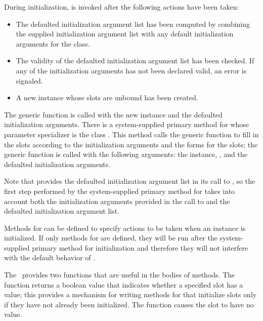 
During initialization,  is invoked
after the following actions have been taken:

\begin{itemize} 

\item  The defaulted initialization argument list has been computed by
combining the supplied initialization argument list with any default
initialization arguments for the class.

\item  The validity of the defaulted initialization argument
list has been checked.  If any of the initialization arguments has not
been declared valid, an error is signaled.

\item  A new instance whose slots are unbound has been created.

\end{itemize}

The generic function  is called with the
new instance and the defaulted initialization arguments.  There is
a system-supplied primary method for 
whose parameter specializer is the class .  This
method calls the generic function  to fill in
the slots according to the initialization arguments and the 
 forms for the slots; the generic function 
 is called with the following arguments: the instance,
, and the defaulted initialization arguments.

Note that  provides the defaulted
initialization argument list in its call to ,
so the first step performed by the system-supplied primary method for
 takes into account both the initialization
arguments provided in the call to  and the
defaulted initialization argument list.

Methods for  can be defined to specify
actions to be taken when an instance is initialized.  If only 
methods for  are defined, they will be
run after the system-supplied primary method for initialization and
therefore they will not interfere with the default behavior of 
.

The \OS\ provides two functions that are useful in the bodies of 
 methods.  The function 
returns a boolean value that indicates whether a specified slot has a
value; this provides a mechanism for writing  methods for
 that initialize slots only if they have
not already been initialized.  The function 
causes the slot to have no value.


